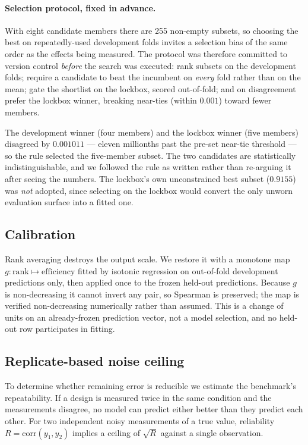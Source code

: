 \documentclass[11pt]{article}
\begin{document}
\paragraph{Selection protocol, fixed in advance.} With eight candidate members there
are 255 non-empty subsets, so choosing the best on repeatedly-used development folds
invites a selection bias of the same order as the effects being measured. The protocol
was therefore committed to version control \emph{before} the search was executed:
rank subsets on the development folds; require a candidate to beat the incumbent on
\emph{every} fold rather than on the mean; gate the shortlist on the lockbox, scored
out-of-fold; and on disagreement prefer the lockbox winner, breaking near-ties (within
$0.001$) toward fewer members.

The development winner (four members) and the lockbox winner (five members) disagreed
by $0.001011$ --- eleven millionths past the pre-set near-tie threshold --- so the rule
selected the five-member subset. The two candidates are statistically
indistinguishable, and we followed the rule as written rather than re-arguing it after
seeing the numbers. The lockbox's own unconstrained best subset ($0.9155$) was
\emph{not} adopted, since selecting on the lockbox would convert the only unworn
evaluation surface into a fitted one.

\subsection{Calibration}
\label{sec:calib}

Rank averaging destroys the output scale. We restore it with a monotone map
$g:\text{rank}\mapsto\text{efficiency}$ fitted by isotonic regression
\citep{zadrozny2002} on out-of-fold development predictions only, then applied once to
the frozen held-out predictions. Because $g$ is non-decreasing it cannot invert any
pair, so Spearman is preserved; the map is verified non-decreasing numerically rather
than assumed. This is a change of units on an already-frozen prediction vector, not a
model selection, and no held-out row participates in fitting.

\subsection{Replicate-based noise ceiling}
\label{sec:ceiling}

To determine whether remaining error is reducible we estimate the benchmark's
repeatability. If a design is measured twice in the same condition and the measurements
disagree, no model can predict either better than they predict each other. For two
independent noisy measurements of a true value, reliability
$R = \mathrm{corr}(y_1,y_2)$ implies a ceiling of $\sqrt{R}$ against a single
observation.
\end{document}
